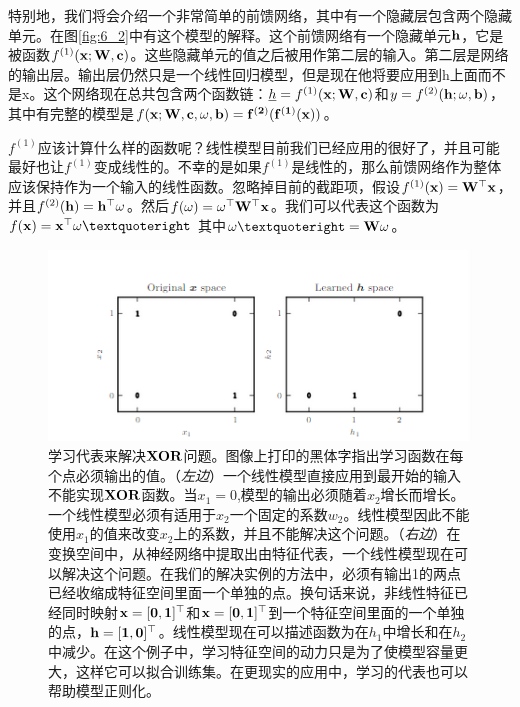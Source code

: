 特别地，我们将会介绍一个非常简单的前馈网络，其中有一个隐藏层包含两个隐藏单元。在图\ref{fig:6_2}中有这个模型的解释。这个前馈网络有一个隐藏单元$\bf{h}$，它是被函数$f^{(1)}(\bf{x};\bf{W},\bf{c})$。这些隐藏单元的值之后被用作第二层的输入。第二层是网络的输出层。输出层仍然只是一个线性回归模型，但是现在他将要应用到h上面而不是x。这个网络现在总共包含两个函数链：$\emph{h}=f^{(1)}(\bf{x};\bf{W},\bf{c})$和$y=f^{(2)}(\bf{h};\bf{\omega},b)$，其中有完整的模型是$f(\bf{x};\bf{W},\bf{c},\bf{\omega},b) = f^{(2)}(f^{(1)}(\bf{x}))$。

$f^{(1)}$应该计算什么样的函数呢？线性模型目前我们已经应用的很好了，并且可能最好也让$f^{(1)}$变成线性的。不幸的是如果$f^{(1)}$是线性的，那么前馈网络作为整体应该保持作为一个输入的线性函数。忽略掉目前的截距项，假设$f^{(1)}(\bf{x})=\bf{W}^\top \bf{x}$，并且$f^{(2)}(\bf{h})=\bf{h}^\top \bf{\omega}$。然后$f(\bf{\omega})=\bf{\omega}^\top \bf{W}^\top \bf{x}$。我们可以代表这个函数为$f(\bf{x})=\bf{x}^\top \bf{\omega’}$ 其中$\bf{\omega’}=\bf{W} \bf{\omega}$。


\begin{figure}[htbp] %
   \centering
   \includegraphics[width=6in]{fig/chap6/6_1.png} 
   \centering
   \caption{学习代表来解决$\bf{XOR}$问题。图像上打印的黑体字指出学习函数在每个点必须输出的值。（\emph{左边}）一个线性模型直接应用到最开始的输入不能实现$\bf{XOR}$函数。当$x_1=0$,模型的输出必须随着$x_2$增长而增长。一个线性模型必须有适用于$x_2$一个固定的系数$w_2$。线性模型因此不能使用$x_1$的值来改变$x_2$上的系数，并且不能解决这个问题。（\emph{右边}）在变换空间中，从神经网络中提取出由特征代表，一个线性模型现在可以解决这个问题。在我们的解决实例的方法中，必须有输出1的两点已经收缩成特征空间里面一个单独的点。换句话来说，非线性特征已经同时映射$\bf{x}=[0,1]^\top$和$\bf{x}=[0,1]^\top$到一个特征空间里面的一个单独的点，$\bf{h}=[1,0]^\top$。线性模型现在可以描述函数为在$h_1$中增长和在$h_2$中减少。在这个例子中，学习特征空间的动力只是为了使模型容量更大，这样它可以拟合训练集。在更现实的应用中，学习的代表也可以帮助模型正则化。}
   \label{fig:6_1}
\end{figure}


